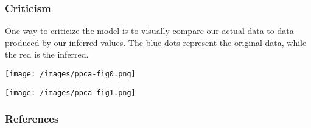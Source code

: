 \subsubsection{Criticism}

One way to criticize the model is to visually compare our actual data
to data produced by our inferred values. The blue dots represent the
original data, while the red is the inferred.

\texttt{[image: /images/ppca-fig0.png]}

\texttt{[image: /images/ppca-fig1.png]}

\subsubsection{References}\label{references}
